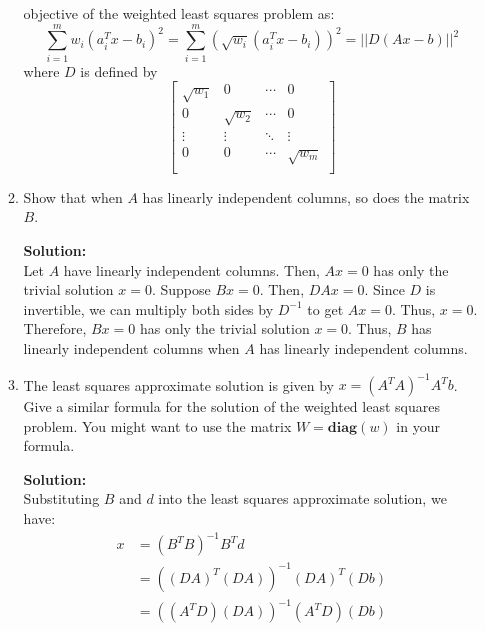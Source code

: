 \begin{enumerate}[label=(\alph*)]
\begin{enumerate}[label=(\alph*)]
\begin{tcolorbox}
			            objective of the weighted least squares problem as:
			            $$ \sum_{i=1}^m w_i(a_i^Tx - b_i)^2 = \sum_{i=1}^m
				            (\sqrt{w_i} (a_i^Tx - b_i))^2 = ||D(Ax - b)||^2$$
			            where $D$ is defined by
			            $$ \begin{bmatrix}
					            \sqrt{w_1} & 0          & \cdots & 0          \\
					            0          & \sqrt{w_2} & \cdots & 0          \\
					            \vdots     & \vdots     & \ddots & \vdots     \\
					            0          & 0          & \cdots & \sqrt{w_m} \\
				            \end{bmatrix} $$
		            \end{tcolorbox}
		      \item Show that when $A$ has linearly independent columns, so does
		            the matrix $B$.
		            \begin{tcolorbox}
			            \textbf{Solution:} \\
			            Let $A$ have linearly independent columns. Then, $Ax =
				            0$ has only the trivial solution $x = 0$. Suppose $Bx =
				            0$. Then, $DAx = 0$. Since $D$ is invertible, we can
			            multiply both sides by $D^{-1}$ to get $Ax = 0$. Thus,
			            $x = 0$. Therefore, $Bx = 0$ has only
			            the trivial solution $x = 0$. Thus, $B$ has linearly
			            independent columns when $A$ has linearly independent
			            columns.
		            \end{tcolorbox}
		      \item The least squares approximate solution is given by $x =
			            (A^TA)^{-1}A^Tb$. Give a similar formula for the
		            solution of the weighted least squares problem. You
		            might want to use the matrix $W =
			            \mathbf{diag}(w)$ in your formula.
		            \begin{tcolorbox}
			            \textbf{Solution:} \\
			            Substituting $B$ and $d$ into the least squares
			            approximate solution, we have:
			            $$ \begin{aligned}
					            x & = (B^TB)^{-1}B^Td             \\
					              & = ((DA)^T(DA))^{-1}(DA)^T(Db) \\
					              & = ((A^TD)(DA))^{-1}(A^TD)(Db) \\

\end{aligned}$$
\end{tcolorbox}
\end{enumerate}
\end{enumerate}
